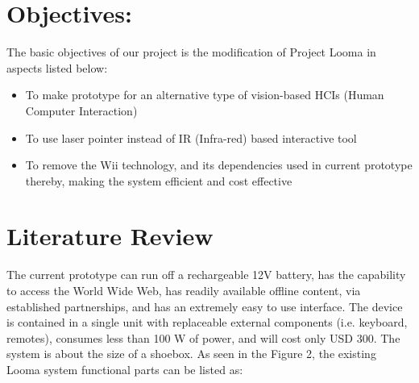 \documentclass[12pt, a4paper]{article}
\begin{document}
\newpage
\section{Objectives:}

The basic objectives of our project is the modification of Project Looma in aspects listed below:

\begin{itemize}
	\item To make prototype for an alternative type of vision-based HCIs (Human Computer Interaction)
	\item To use laser pointer instead of IR (Infra-red) based interactive tool
	\item To remove the Wii technology, and its dependencies used in current prototype thereby, making the system efficient and cost effective
\end{itemize}


\newpage
\section{Literature Review}
The current prototype can run off a rechargeable 12V battery, has the capability to access the World Wide Web, has readily available offline content, via established partnerships, and has an extremely easy to use interface. The device is contained in a single unit with replaceable external components (i.e. keyboard, remotes), consumes less than 100 W of power, and will cost only USD 300. The system is about the size of a shoebox. 
As seen in the Figure 2, the existing Looma system functional parts can be listed as:
\end{document}
